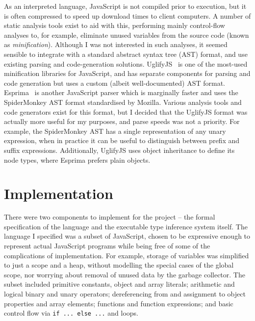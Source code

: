 \documentclass[12pt,a4paper,twoside,openright]{report}
\newcommand*{\js}{\texttt}
\begin{document}
As an interpreted language, JavaScript is not compiled prior to execution, but
it is often compressed to speed up download times to client computers. A number
of static analysis tools exist to aid with this, performing mainly control-flow
analyses to, for example, eliminate unused variables from the source code
(known as \textit{minification}). Although I was not interested in such
analyses, it seemed sensible to integrate with a standard abstract syntax tree
(AST) format, and use existing parsing and code-generation solutions.
UglifyJS~\cite{uglify} is one of the most-used minification libraries for
JavaScript, and has separate components for parsing and code generation but
uses a custom (albeit well-documented) AST format. Esprima~\cite{esprima} is
another JavaScript parser which is marginally faster and uses the SpiderMonkey
AST format standardised by Mozilla. Various analysis tools and code generators
exist for this format, but I decided that the UglifyJS format was actually more
useful for my purposes, and parse speeds was not a priority. For example, the
SpiderMonkey AST has a single representation of any unary expression, when in
practice it can be useful to distinguish between prefix and suffix expressions.
Additionally, UglifyJS uses object inheritance to define its node types, where
Esprima prefers plain objects. 

\chapter{Implementation}\label{implementation}

There were two components to implement for the project -- the formal
specification of the language and the executable type inference system itself.
The language I specified was a subset of JavaScript, chosen to be expressive
enough to represent actual JavaScript programs while being free of some of the
complications of implementation. For example, storage of variables was
simplified to just a scope and a heap, without modelling the special cases of
the global scope, nor worrying about removal of unused data by the garbage
collector. The subset included primitive constants, object and array literals;
arithmetic and logical binary and unary operators; dereferencing from and
assignment to object properties and array elements; functions and function
expressions; and basic control flow via \js{if ... else ...} and loops. 
\end{document}
